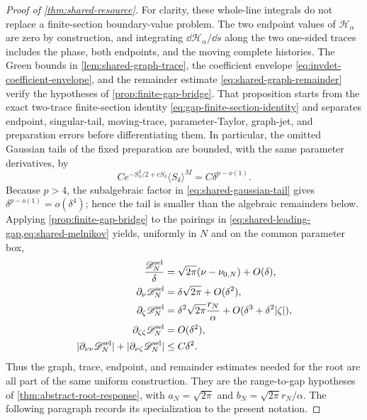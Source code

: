 \begin{proof}[Proof of \cref{thm:shared-resource}]
For clarity, these whole-line integrals do not replace a finite-section
boundary-value problem.  The two endpoint values of
\(\mathscr H_\alpha\) are zero by construction, and integrating
\(\dd\mathscr H_\alpha/\dd s\) along the two one-sided traces includes the
phase, both endpoints, and the moving complete histories.  The Green bounds
in \cref{lem:shared-graph-trace}, the coefficient envelope
\cref{eq:invdet-coefficient-envelope}, and the remainder estimate
\cref{eq:shared-graph-remainder} verify the hypotheses of
\cref{prop:finite-gap-bridge}.  That proposition starts from the exact two-trace
finite-section identity \cref{eq:gap-finite-section-identity} and separates
endpoint, singular-tail, moving-trace, parameter-Taylor, graph-jet, and
preparation errors before differentiating them.  In particular, the omitted
Gaussian tails of the fixed preparation are bounded, with the same parameter
derivatives, by
\begin{equation}
 C e^{-S_\delta^2/2+cS_\delta}
       \langle S_\delta\rangle^M
 =C\delta^{p-o(1)}.                                   \label{eq:shared-gaussian-tail}
\end{equation}
Because \(p>4\), the subalgebraic factor in
\cref{eq:shared-gaussian-tail} gives
\(\delta^{p-o(1)}=o(\delta^4)\); hence the tail is smaller than the
algebraic remainders below.  Applying
\cref{prop:finite-gap-bridge} to the pairings in
\cref{eq:shared-leading-gap,eq:shared-melnikov} yields, uniformly
in \(N\) and on the common parameter box,
\begin{align}
 \frac{\mathscr D^{\rm sel}_N}\delta
 &=\sqrt{2\pi}(\nu-\nu_{0,N})+O(\delta),
                                                               \label{eq:shared-gap-expansion}\\
 \partial_\nu\mathscr D^{\rm sel}_N
 &=\delta\sqrt{2\pi}+O(\delta^2),                    \label{eq:shared-gap-nu}\\
 \partial_\zeta\mathscr D^{\rm sel}_N
 &=\delta^2\sqrt{2\pi}\frac{r_N}{\alpha}
       +O(\delta^3+\delta^2|\zeta|),                 \label{eq:shared-gap-zeta}\\
 \partial_{\zeta\zeta}\mathscr D^{\rm sel}_N
 &=O(\delta^2),                                       \label{eq:shared-gap-zz}\\
 |\partial_{\nu\nu}\mathscr D^{\rm sel}_N|
  +|\partial_{\nu\zeta}\mathscr D^{\rm sel}_N|
 &\le C\delta^2.                                      \label{eq:shared-gap-mixed}
\end{align}
Thus the graph, trace, endpoint, and remainder estimates needed for the
root are all part of the same uniform construction.  They are the
range-to-gap hypotheses of \cref{thm:abstract-root-response}, with
\(a_N=\sqrt{2\pi}\) and
\(b_N=\sqrt{2\pi}r_N/\alpha\).  The following paragraph records its
specialization to the present notation.


\end{proof}
